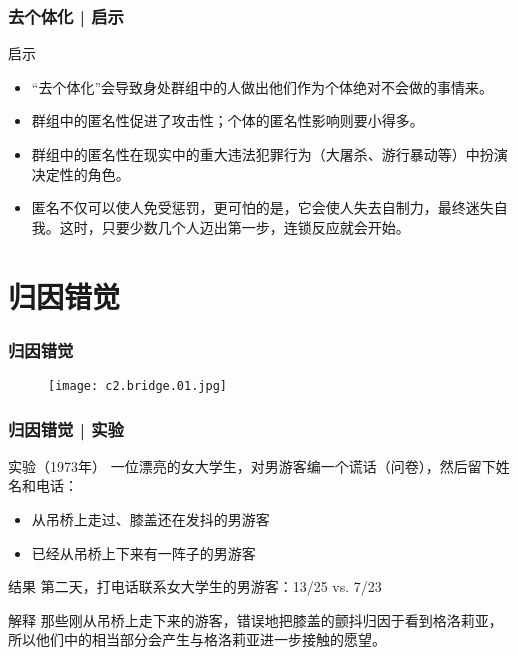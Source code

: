 \begin{frame}
  \frametitle{去个体化 | \alert{启示}}
  \begin{block}{启示}
    \begin{itemize}
      \item “去个体化”会导致身处群组中的人做出他们作为个体绝对不会做的事情来。
      \item 群组中的匿名性促进了攻击性；个体的匿名性影响则要小得多。
      \item 群组中的匿名性在现实中的重大违法犯罪行为（大屠杀、游行暴动等）中扮演决定性的角色。
      \item 匿名不仅可以使人免受惩罚，更可怕的是，它会使人失去自制力，最终迷失自我。这时，只要少数几个人迈出第一步，连锁反应就会开始。
    \end{itemize}
  \end{block}
\end{frame}

\section{归因错觉}
\begin{frame}
  \frametitle{归因错觉}
  \begin{figure}
    \centering
    \texttt{[image: c2.bridge.01.jpg]}
  \end{figure}
\end{frame}

\begin{frame}
  \frametitle{归因错觉 | 实验}
  \begin{block}{实验（1973年）}
    一位漂亮的女大学生，对男游客编一个谎话（问卷），然后留下姓名和电话：
    \begin{itemize}
      \item 从吊桥上走过、膝盖还在发抖的男游客
      \item 已经从吊桥上下来有一阵子的男游客
    \end{itemize}
  \end{block}
  \pause
  \begin{block}{结果}
    第二天，打电话联系女大学生的男游客：13/25 vs. 7/23
  \end{block}
  \pause
  \begin{block}{解释}
那些刚从吊桥上走下来的游客，错误地把膝盖的颤抖归因于看到格洛莉亚，所以他们中的相当部分会产生与格洛莉亚进一步接触的愿望。
  \end{block}
\end{frame}

